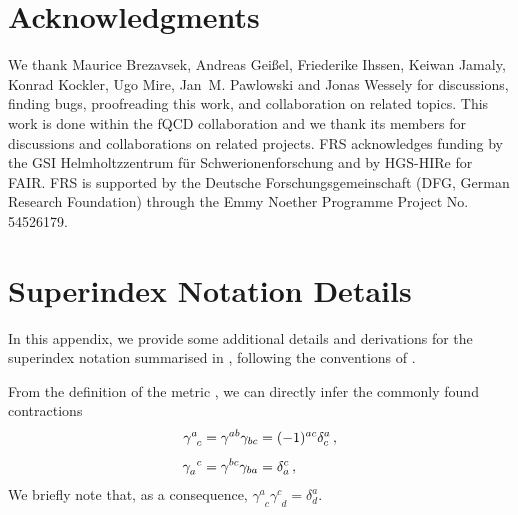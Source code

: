 \documentclass[preprint,10pt,sort&compress]{elsarticle}
\begin{document}
\section*{Acknowledgments}
We thank Maurice Brezavsek, Andreas Gei\ss{}el, Friederike Ihssen, Keiwan Jamaly, Konrad Kockler, Ugo Mire, Jan~M. Pawlowski and Jonas Wessely for discussions, finding bugs, proofreading this work, and collaboration on related topics. This work is done within the fQCD collaboration \cite{fQCD} and we thank its members for discussions and collaborations on related projects.
FRS acknowledges funding by the GSI Helmholtzzentrum f\"ur Schwerionenforschung and by HGS-HIRe for FAIR. 
FRS is supported by the Deutsche Forschungsgemeinschaft (DFG, German Research Foundation) through the Emmy Noether Programme Project No. 54526179.

\vspace{1cm}


\appendix

\gdef\thesection{\Alph{section}}
\makeatletter
\renewcommand\@seccntformat[1]{\appendixname\ \csname the#1\endcsname.\hspace{0.5em}}
\makeatother

\renewcommand{\thefigure}{\Alph{section}.\arabic{figure}}
\setcounter{figure}{0}

\begingroup
\allowdisplaybreaks


\section{Superindex Notation Details}
\label{app:notation_details}

In this appendix, we provide some additional details and derivations for the superindex notation summarised in , following the conventions of \cite{Pawlowski:2005xe, Pawlowski:2021tkk}.

From the definition of the metric , we can directly infer the commonly found contractions
%
\begin{align}
	\gamma^{a}_{\phantom{a}c} &= \gamma^{ab}\gamma_{bc} = (-1)^{ac}\delta^a_c
	\,,\notag\\[1ex]
	\gamma_{a}^{\phantom{a}c} &= \gamma^{bc}\gamma_{ba} = \delta^c_a
	\,,
\end{align}
%
We briefly note that, as a consequence, $\gamma^{a}_{\phantom{a}c}\gamma^{c}_{\phantom{c}d} = \delta^{a}_d$.
\end{document}
